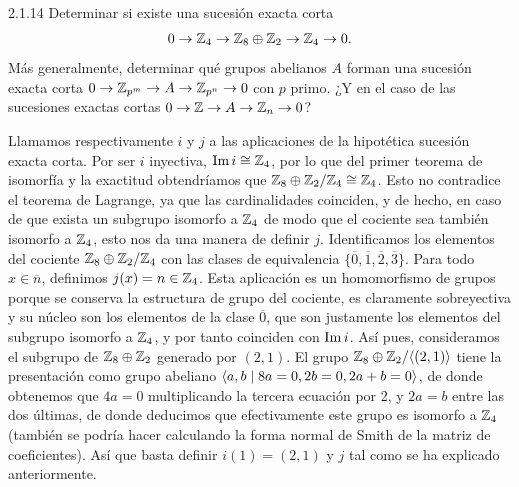 \documentclass[twoside]{article}
\begin{document}
\begin{ejercicio}{2.1.14}
Determinar si existe una sucesión exacta corta $$0\to\mathbb{Z}_4\to \mathbb{Z}_8\oplus\mathbb{Z}_2\to \mathbb{Z}_4\to 0.$$ Más generalmente, determinar qué grupos abelianos $A$ forman una sucesión exacta corta $0\to\mathbb{Z}_{p^m}\to A\to\mathbb{Z}_{p^n}\to 0$ con $p$ primo. ¿Y en el caso de las sucesiones exactas cortas $0\to\mathbb{Z}\to A\to\mathbb{Z}_n\to 0$?
\end{ejercicio}
\begin{solucion}
Llamamos respectivamente $i$ y $j$ a las aplicaciones de la hipotética sucesión exacta corta. Por ser $i$ inyectiva, $\operatorname{Im}{i}\cong\mathbb{Z}_4$, por lo que del primer teorema de isomorfía y la exactitud obtendríamos que $\mathbb{Z}_8\oplus\mathbb{Z}_2/\mathbb{Z}_4\cong\mathbb{Z}_4$. Esto no contradice el teorema de Lagrange, ya que las cardinalidades coinciden, y de hecho, en caso de que exista un subgrupo isomorfo a $\mathbb{Z}_4$ de modo que el cociente sea también isomorfo a $\mathbb{Z}_4$, esto nos da una manera de definir $j$. Identificamos los elementos del cociente $\mathbb{Z}_8\oplus\mathbb{Z}_2/\mathbb{Z}_4$ con las clases de equivalencia $\{\overline{0}, \overline{1},\overline{2},\overline{3}\}$. Para todo $x\in\overline{n}$, definimos $j(x)=n\in\mathbb{Z}_4$. Esta aplicación es un homomorfismo de grupos porque se conserva la estructura de grupo del cociente, es claramente sobreyectiva y su núcleo son los elementos de la clase $\overline{0}$, que son justamente los elementos del subgrupo isomorfo a $\mathbb{Z}_4$, y por tanto coinciden con $\operatorname{Im}{i}$. Así pues, consideramos el subgrupo de $\mathbb{Z}_8\oplus\mathbb{Z}_2$ generado por $(2,1)$. El grupo $\mathbb{Z}_8\oplus\mathbb{Z}_2/\langle{(2,1)}\rangle$ tiene la presentación como grupo abeliano $\langle{a,b\mid 8a=0,2b=0, 2a+b=0}\rangle$, de donde obtenemos que $4a=0$ multiplicando la tercera ecuación por 2, y  $2a=b$ entre las dos últimas, de donde deducimos que efectivamente este grupo es isomorfo a $\mathbb{Z}_4$ (también se podría hacer calculando la forma normal de Smith de la matriz de coeficientes). Así que basta definir $i(1)=(2,1)$ y $j$ tal como se ha explicado anteriormente.


\end{solucion}
\end{document}
